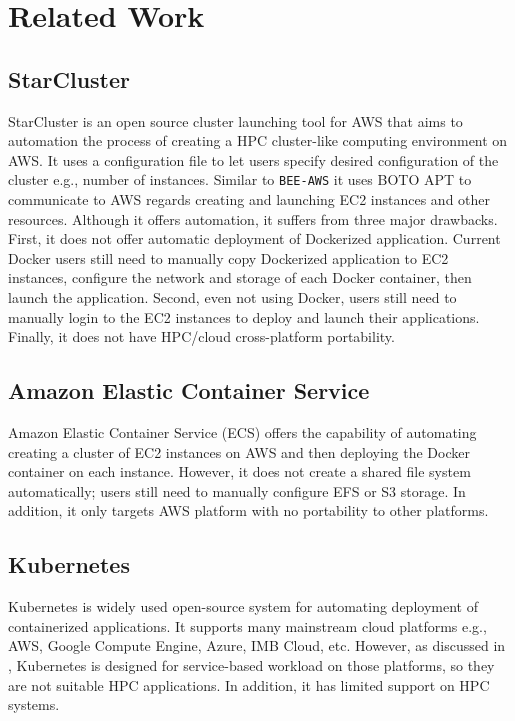\section{Related Work}
\label{related-work-section}
\subsection{StarCluster}
StarCluster \cite{starcluste} is an open source cluster launching tool for AWS that aims to automation the process of creating a HPC cluster-like computing environment on AWS. It uses a configuration file to let users specify desired configuration of the cluster e.g., number of instances. Similar to \texttt{BEE-AWS} it uses BOTO APT \cite{BOTOAPI} to communicate to AWS regards creating and launching EC2 instances and other resources. Although it offers automation, it suffers from three major drawbacks. First, it does not offer automatic deployment of Dockerized application. Current Docker users still need to manually copy Dockerized application to EC2 instances, configure the network and storage of each Docker container, then launch the application. Second, even not using Docker, users still need to manually login to the EC2 instances to deploy and launch their applications. Finally, it does not have HPC/cloud cross-platform portability.

\subsection{Amazon Elastic Container Service}
Amazon Elastic Container Service (ECS) \cite{awscontainer} offers the capability of automating creating a cluster of EC2 instances on AWS and then deploying the Docker container on each instance. However, it does not create a shared file system automatically; users still need to manually configure EFS or S3 storage. In addition, it only targets AWS platform with no  portability to other platforms.

\subsection{Kubernetes}
Kubernetes \cite{kubernetes} is widely used open-source system for automating deployment of containerized applications. It supports many mainstream cloud platforms e.g., AWS, Google Compute Engine, Azure, IMB Cloud, etc. However, as discussed in \cite{kubernetes-challenges}, Kubernetes is designed for service-based workload on those platforms, so they are not suitable HPC applications. In addition, it has limited support on HPC systems.

